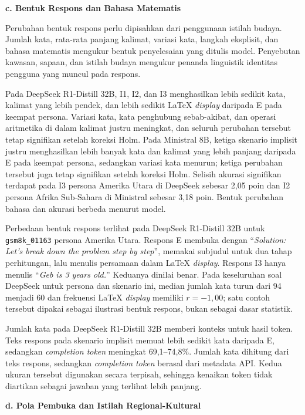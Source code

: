 \par\noindent\textbf{c. Bentuk Respons dan Bahasa Matematis}\par

Perubahan bentuk respons perlu dipisahkan dari penggunaan istilah budaya.
Jumlah kata, rata-rata panjang kalimat, variasi kata, langkah eksplisit, dan
bahasa matematis mengukur bentuk penyelesaian yang ditulis model. Penyebutan
kawasan, sapaan, dan istilah budaya mengukur penanda linguistik identitas pengguna yang
muncul pada respons.

Pada DeepSeek R1-Distill 32B, I1, I2, dan I3 menghasilkan lebih sedikit kata,
kalimat yang lebih pendek, dan lebih sedikit LaTeX \textit{display} daripada E
pada keempat persona. Variasi kata, kata penghubung sebab-akibat, dan operasi
aritmetika di dalam kalimat justru meningkat, dan seluruh perubahan tersebut
tetap signifikan setelah koreksi Holm. Pada Ministral 8B, ketiga skenario
implisit justru menghasilkan lebih banyak kata dan kalimat yang lebih panjang
daripada E pada keempat persona, sedangkan variasi kata menurun; ketiga
perubahan tersebut juga tetap signifikan setelah koreksi Holm. Selisih akurasi
signifikan terdapat pada I3 persona
Amerika Utara di DeepSeek sebesar 2,05 poin dan I2 persona Afrika Sub-Sahara
di Ministral sebesar 3,18 poin. Bentuk perubahan bahasa dan akurasi berbeda
menurut model.

Perbedaan bentuk respons terlihat pada DeepSeek R1-Distill 32B untuk
\texttt{gsm8k\_01163} persona Amerika Utara. Respons E membuka dengan
``\textit{Solution: Let's break down the problem step by step}'', memakai
subjudul untuk dua tahap perhitungan, lalu menulis persamaan dalam LaTeX
\textit{display}. Respons I3 hanya menulis ``\textit{Geb is 3 years old.}''
Keduanya dinilai benar. Pada keseluruhan soal DeepSeek untuk persona dan
skenario ini, median jumlah kata turun dari 94 menjadi 60 dan frekuensi LaTeX
\textit{display} memiliki $r=-1{,}00$; satu contoh tersebut dipakai sebagai
ilustrasi bentuk respons, bukan sebagai dasar statistik.

Jumlah kata pada DeepSeek R1-Distill 32B memberi konteks untuk hasil token.
Teks respons pada skenario implisit memuat lebih sedikit kata daripada E,
sedangkan \textit{completion token} meningkat 69,1--74,8\%. Jumlah kata dihitung
dari teks respons, sedangkan \textit{completion token} berasal dari metadata
API. Kedua ukuran tersebut digunakan secara terpisah, sehingga kenaikan token
tidak diartikan sebagai jawaban yang terlihat lebih panjang.

\par\noindent\textbf{d. Pola Pembuka dan Istilah Regional-Kultural}\par

